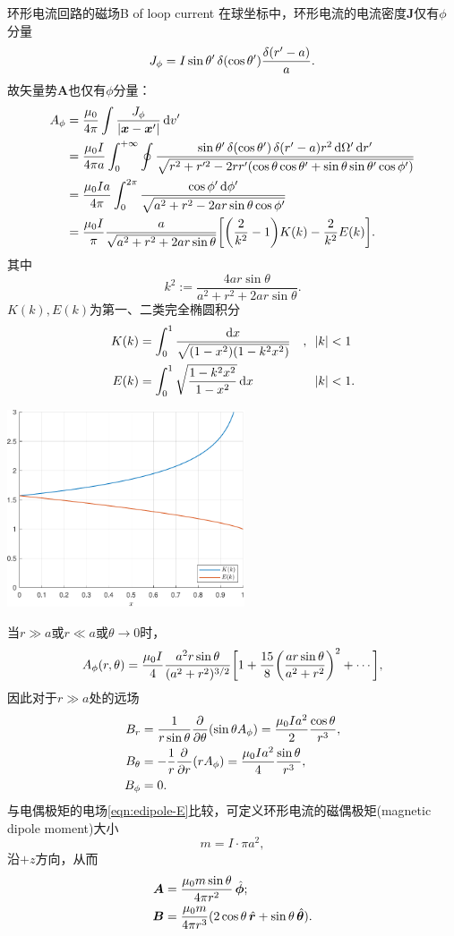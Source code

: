 \begin{example}{环形电流回路的磁场}{B of loop current}
    在球坐标中，环形电流的电流密度$\bm J$仅有$\phi$分量
    \[
        J_\phi=I\sin\theta'\mathop{}\!\delta(\cos\theta')\frac{\delta(r'-a)}a.
    \]
    故矢量势$\bm A$也仅有$\phi$分量：
    \begin{align*}
        A_\phi&=\frac{\mu_0}{4\pi}\int\frac{J_\phi}{|\bm x-\bm x'|}\d v'\\
        &=\frac{\mu_0I}{4\pi a}\int\zti\oint\frac{\sin\theta'\vd(\cos\theta')\vd(r'-a)r^2\d\Omega'\d r'}{\sqrt{r^2+r'^2-2rr'(\cos\theta\cos\theta'+\sin\theta\sin\theta'\cos\phi')}}\\
        &=\frac{\mu_0Ia}{4\pi}\int_0^{2\pi}\frac{\cos\phi'\d\phi'}{\sqrt{a^2+r^2-2ar\sin\theta\cos\phi'}}\\
        &=\frac{\mu_0I}\pi\frac{a}{\sqrt{a^2+r^2+2ar\sin\theta}}\biggfkh{\biggkh{\frac2{k^2}-1}K(k)-\frac2{k^2}E(k)}.%
    \end{align*}
    其中 
    \[
        k^2:=\frac{4ar\sin\theta}{a^2+r^2+2ar\sin\theta}.
    \]
    $K(k),E(k)$为第一、二类完全椭圆积分
    \begin{alignat*}{2}
        K(k)&=\int_0^1\frac{\mathop{}\!\mathrm{d} x}{\sqrt{(1-x^2)(1-k^2x^2)}}&,\enspace|k|&<1\\
        E(k)&=\int_0^1\sqrt{\frac{1-k^2x^2}{1-x^2}}\mathop{}\!\mathrm{d} x&|k|&<1.
    \end{alignat*}
    \begin{center}
        \includegraphics[width=7cm]{graphs/ellipseKE.pdf}
    \end{center}
    当$r\gg a$或$r\ll a$或$\theta\to 0$时，
    \[
        A_\phi(r,\theta)=\frac{\mu_0I}4\frac{a^2r\sin\theta}{(a^2+r^2)^{3/2}}\biggl[1+\frac{15}8\biggl(\frac{ar\sin\theta}{a^2+r^2}\biggr)^2+\cdots\biggr],
    \]
    因此对于$r\gg a$处的远场
    \begin{align*}
        B_r&=\frac1{r\sin\theta}\frac{\partial^{{}}}{\partial{\theta}^{{}}}(\sin\theta A_\phi)=\frac{\mu_0Ia^2}2\frac{\cos\theta}{r^3},\\
        B_\theta&=-\frac1r\frac{\partial^{{}}}{\partial{r}^{{}}}(rA_\phi)=\frac{\mu_0Ia^2}4\frac{\sin\theta}{r^3},\\
        B_\phi&=0.
    \end{align*}
    与电偶极矩的电场\eqref{eqn:edipole-E}比较，可定义环形电流的磁偶极矩(magnetic dipole moment)大小
    \[
        m=I\cdot\pi a^2,
    \]
    沿$+z$方向，从而 
    \begin{align}
        \bm A&=\frac{\mu_0m\sin\theta}{4\pi r^2}\mathop{}\!\hat{\bm{\phi}};\\
        \bm B&=\frac{\mu_0m}{4\pi r^3}(2\cos\theta\mathop{}\!\hat{\bm{r}}+\sin\theta\mathop{}\!\hat{\bm{\theta}}).
    \end{align}
\end{example}
